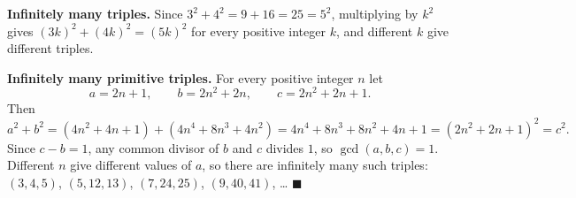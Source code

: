 \textbf{Infinitely many triples.} Since $3^2+4^2=9+16=25=5^2$, multiplying by $k^2$ gives $(3k)^2+(4k)^2=(5k)^2$ for every positive integer $k$, and different $k$ give different triples.

\textbf{Infinitely many primitive triples.} For every positive integer $n$ let
\[a=2n+1,\qquad b=2n^2+2n,\qquad c=2n^2+2n+1 .\]
Then
\[a^2+b^2=\left(4n^2+4n+1\right)+\left(4n^4+8n^3+4n^2\right)=4n^4+8n^3+8n^2+4n+1=\left(2n^2+2n+1\right)^2=c^2 .\]
Since $c-b=1$, any common divisor of $b$ and $c$ divides $1$, so $\gcd(a,b,c)=1$. Different $n$ give different values of $a$, so there are infinitely many such triples: $(3,4,5)$, $(5,12,13)$, $(7,24,25)$, $(9,40,41)$, \ldots{} $\blacksquare$
